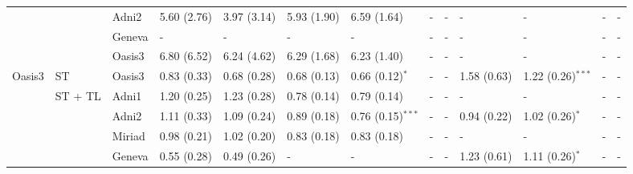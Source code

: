 \begin{table*}
{\begin{tabular}{lllllllllllll}
       &                 & Adni2           &  5.60 (2.76) &  3.97 (3.14)       &  5.93 (1.90) &  6.59 (1.64)         &            - &            -         &            - &            -         &            - &            -         \\
       &                 & Geneva          &            - &            -       &            - &            -         &            - &            -         &            - &            -         &            - &            -         \\
       &                 & Oasis3          &  6.80 (6.52) &  6.24 (4.62)       &  6.29 (1.68) &  6.23 (1.40)         &            - &            -         &            - &            -         &            - &            -         \\
\toprule
Oasis3 &          ST     & Oasis3          &  0.83 (0.33) &  0.68 (0.28)       &  0.68 (0.13) &  0.66 (0.12)$^{*}$   &            - &            -         &  1.58 (0.63) &  1.22 (0.26)$^{***}$ &            - &            -         \\
\cmidrule(lr){2-13}
       &        ST + TL  & Adni1           &  1.20 (0.25) &  1.23 (0.28)       &  0.78 (0.14) &  0.79 (0.14)         &            - &            -         &            - &            -         &            - &            -         \\
       &                 & Adni2           &  1.11 (0.33) &  1.09 (0.24)       &  0.89 (0.18) &  0.76 (0.15)$^{***}$ &            - &            -         &  0.94 (0.22) &  1.02 (0.26)$^{*}$   &            - &            -         \\
       &                 & Miriad          &  0.98 (0.21) &  1.02 (0.20)       &  0.83 (0.18) &  0.83 (0.18)         &            - &            -         &            - &            -         &            - &            -         \\
       &                 & Geneva          &  0.55 (0.28) &  0.49 (0.26)       &            - &            -         &            - &            -         &  1.23 (0.61) &  1.11 (0.26)$^{*}$   &            - &            -         \\
\bottomrule
\end{tabular}}
\end{table*}

